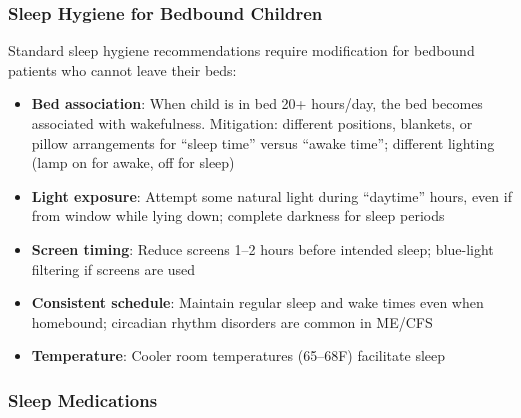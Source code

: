 \subsubsection{Sleep Hygiene for Bedbound Children}

Standard sleep hygiene recommendations require modification for bedbound patients who cannot leave their beds:

\begin{itemize}
    \item \textbf{Bed association}: When child is in bed 20+ hours/day, the bed becomes associated with wakefulness. Mitigation: different positions, blankets, or pillow arrangements for ``sleep time'' versus ``awake time''; different lighting (lamp on for awake, off for sleep)
    \item \textbf{Light exposure}: Attempt some natural light during ``daytime'' hours, even if from window while lying down; complete darkness for sleep periods
    \item \textbf{Screen timing}: Reduce screens 1--2 hours before intended sleep; blue-light filtering if screens are used
    \item \textbf{Consistent schedule}: Maintain regular sleep and wake times even when homebound; circadian rhythm disorders are common in ME/CFS
    \item \textbf{Temperature}: Cooler room temperatures (65--68{\textdegree}F) facilitate sleep
\end{itemize}

\subsubsection{Sleep Medications}

